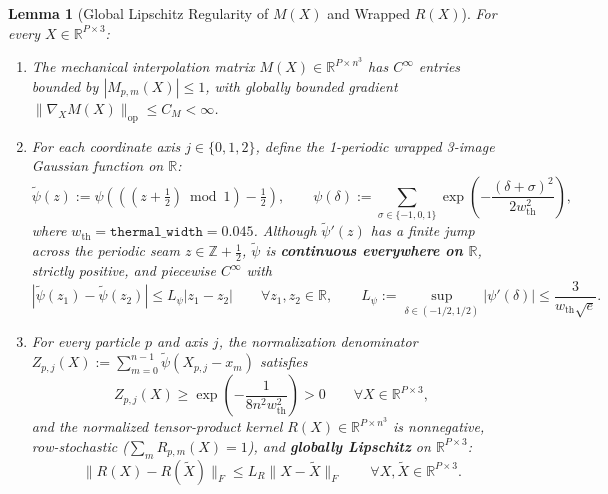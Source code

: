 \documentclass[11pt,a4paper]{article}
\newtheorem{lemma}[theorem]{Lemma}
\theoremstyle{definition}
\begin{document}
\begin{lemma}[Global Lipschitz Regularity of $M(X)$ and Wrapped $R(X)$]
\label{lem:kernels}
For every $X \in \mathbb{R}^{P \times 3}$:
\begin{enumerate}
  \item The mechanical interpolation matrix $M(X) \in \mathbb{R}^{P \times n^3}$ has $C^\infty$ entries bounded by $|M_{p,m}(X)| \le 1$, with globally bounded gradient $\|\nabla_X M(X)\|_{\mathrm{op}} \le C_M < \infty$.
  \item For each coordinate axis $j \in \{0,1,2\}$, define the 1-periodic wrapped 3-image Gaussian function on $\mathbb{R}$:
  \begin{equation}
    \widetilde{\psi}(z) := \psi\!\left(\left(\left(z + \tfrac{1}{2}\right) \bmod 1\right) - \tfrac{1}{2}\right), \qquad \psi(\delta) := \sum_{\sigma \in \{-1, 0, 1\}} \exp\!\left(-\frac{(\delta + \sigma)^2}{2 w_{\mathrm{th}}^2}\right),
  \end{equation}
  where $w_{\mathrm{th}} = \texttt{thermal\_width} = 0.045$. Although $\widetilde{\psi}'(z)$ has a finite jump across the periodic seam $z \in \mathbb{Z} + \frac{1}{2}$, $\widetilde{\psi}$ is \textbf{continuous everywhere on $\mathbb{R}$}, strictly positive, and piecewise $C^\infty$ with
  \begin{equation}
    |\widetilde{\psi}(z_1) - \widetilde{\psi}(z_2)| \le L_\psi |z_1 - z_2| \qquad \forall z_1, z_2 \in \mathbb{R}, \qquad L_\psi := \sup_{\delta \in (-1/2, 1/2)} |\psi'(\delta)| \le \frac{3}{w_{\mathrm{th}}\sqrt{e}}.
  \end{equation}
  \item For every particle $p$ and axis $j$, the normalization denominator $Z_{p,j}(X) := \sum_{m=0}^{n-1} \widetilde{\psi}(X_{p,j} - x_m)$ satisfies
  \begin{equation}
    Z_{p,j}(X) \ge \exp\!\left(-\frac{1}{8 n^2 w_{\mathrm{th}}^2}\right) > 0 \qquad \forall X \in \mathbb{R}^{P \times 3},
  \end{equation}
  and the normalized tensor-product kernel $R(X) \in \mathbb{R}^{P \times n^3}$ is nonnegative, row-stochastic ($\sum_{m} R_{p,m}(X) = 1$), and \textbf{globally Lipschitz} on $\mathbb{R}^{P \times 3}$:
  \begin{equation}
    \|R(X) - R(\widetilde{X})\|_F \le L_R \|X - \widetilde{X}\|_F \qquad \forall X, \widetilde{X} \in \mathbb{R}^{P \times 3}.
  \end{equation}
\end{enumerate}
\end{lemma}
\end{document}
